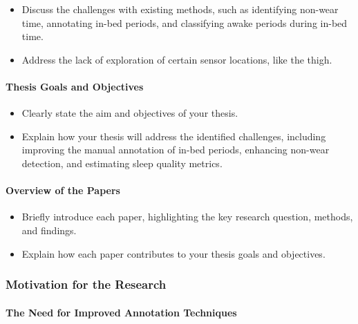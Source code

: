 \documentclass[
  8pt,
  letterpaper,
  DIV=11,
  numbers=noendperiod]{scrartcl}
\let\oldparagraph\paragraph
\renewcommand{\paragraph}[1]{\oldparagraph{#1}\mbox{}}
\providecommand{\tightlist}{%
  \setlength{\itemsep}{0pt}\setlength{\parskip}{0pt}}\usepackage{longtable,booktabs,array}
\begin{document}
\begin{itemize}
\tightlist
\item
  Discuss the challenges with existing methods, such as identifying
  non-wear time, annotating in-bed periods, and classifying awake
  periods during in-bed time.
\item
  Address the lack of exploration of certain sensor locations, like the
  thigh.
\end{itemize}

\hypertarget{thesis-goals-and-objectives}{%
\paragraph{Thesis Goals and
Objectives}\label{thesis-goals-and-objectives}}

\begin{itemize}
\tightlist
\item
  Clearly state the aim and objectives of your thesis.
\item
  Explain how your thesis will address the identified challenges,
  including improving the manual annotation of in-bed periods, enhancing
  non-wear detection, and estimating sleep quality metrics.
\end{itemize}

\hypertarget{overview-of-the-papers}{%
\paragraph{Overview of the Papers}\label{overview-of-the-papers}}

\begin{itemize}
\item
  Briefly introduce each paper, highlighting the key research question,
  methods, and findings.
\item
  Explain how each paper contributes to your thesis goals and
  objectives.
\end{itemize}

\hypertarget{motivation-for-the-research}{%
\subsubsection{Motivation for the
Research}\label{motivation-for-the-research}}

\hypertarget{the-need-for-improved-annotation-techniques}{%
\paragraph{The Need for Improved Annotation
Techniques}\label{the-need-for-improved-annotation-techniques}}
\end{document}
